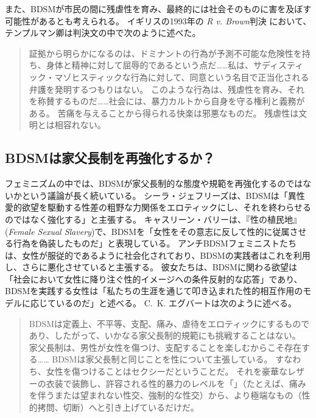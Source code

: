 \documentclass[paper=a4,book,openany]{jlreq} \usepackage{mystyle}
\begin{document}
また、BDSMが市民の間に残虐性を育み、最終的には社会そのものに害を及ぼす可能性があるとも考えられる。
イギリスの1993年の \emph{R v. Brown}判決 において、テンプルマン卿は判決文の中で次のように述べた。

\begin{quote}
証拠から明らかになるのは、ドミナントの行為が予測不可能な危険性を持ち、身体と精神に対して屈辱的であるという点だ……私は、サディスティック・マゾヒスティックな行為に対して、同意という名目で正当化される弁護を発明するつもりはない。
このような行為は、残虐性を育み、それを称賛するものだ……社会には、暴力カルトから自身を守る権利と義務がある。
苦痛を与えることから得られる快楽は邪悪なものだ。
残虐性は文明とは相容れない。
\end{quote}

\subsection{BDSMは家父長制を再強化するか？}

フェミニズムの中では、BDSMが家父長制的な態度や規範を再強化するのではないかという議論が長く続いている。
シーラ・ジェフリーズは、BDSMは「異性愛的欲望を駆動する性差の粗野な力関係をエロティックにし、それを終わらせるのではなく強化する」と主張する\citep[p.86]{jeffreys96:_heter_desir_gender}。
キャスリーン・バリーは、『性の植民地』(\emph{Female Sexual Slavery})で、BDSMを「女性をその意志に反して性的に従属させる行為を偽装したものだ」と表現している\citep[p.209]{barry79:_femal_sexual_slaver}。
アンチBDSMフェミニストたちは、女性が服従的であるように社会化されており、BDSMの実践者はこれを利用し、さらに悪化させていると主張する。
彼女たちは、BDSMに関わる欲望は「社会において女性に降り注ぐ性的イメージへの条件反射的な応答」であり、BDSMを実践する女性は「私たちの生涯を通じて叩き込まれた性的相互作用のモデルに応じているのだ」と述べる\citep[p.139]{nichols82:_is_sadom_femin}。
C.~K. エグバートは次のように述べる。

\begin{quote}
 BDSMは定義上、不平等、支配、痛み、虐待をエロティックにするものであり、したがって、いかなる家父長制的規範にも挑戦することはない。
家父長制は、男性が女性を傷つけ、支配することを楽しむからこそ存在する…… BDSMは家父長制と同じことを性について主張している。
すなわち、女性を傷つけることはセクシーだということだ。
それを豪華なレザーの衣装で装飾し、許容される性的暴力のレベルを「」（たとえば、痛みを伴うまたは望まれない性交、強制的な性交）から、より極端なもの（性的拷問、切断）へと引き上げているだけだ。
\citep{egbert15:_bdsm_faq_frequen_asser_quibb}
\end{quote}
\end{document}
